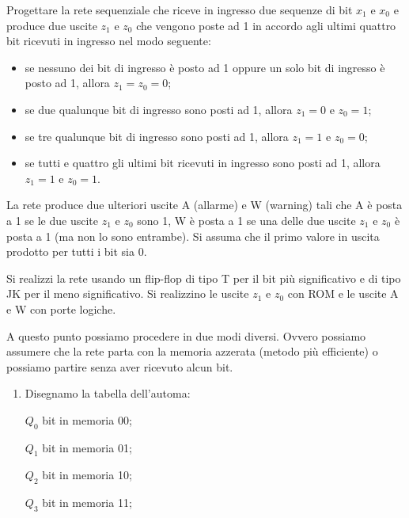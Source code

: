 \begin{exercise}
    Progettare la rete sequenziale che riceve in ingresso due sequenze di bit $x_1$ e $x_0$ e produce due uscite $z_1$ e $z_0$ che vengono poste ad 1 in accordo agli ultimi quattro bit ricevuti in ingresso nel modo seguente:
    \begin{itemize}
        \item se nessuno dei bit di ingresso è posto ad 1 oppure un solo bit di ingresso è posto ad 1, allora $z_1=z_0=0$;
        \item se due qualunque bit di ingresso sono posti ad 1, allora $z_1=0$ e $z_0=1$;
        \item se tre qualunque bit di ingresso sono posti ad 1, allora $z_1=1$ e $z_0=0$;
        \item se tutti e quattro gli ultimi bit ricevuti in ingresso sono posti ad 1, allora $z_1=1$ e $z_0=1$.
    \end{itemize}

La rete produce due ulteriori uscite A (allarme) e W (warning) tali che A è posta a 1 se le due uscite $z_1$ e $z_0$ sono 1, W è posta a 1 se una delle due uscite $z_1$ e $z_0$ è posta a 1 (ma non lo sono entrambe).
Si assuma che il primo valore in uscita prodotto per tutti i bit sia 0.

Si realizzi la rete usando un flip-flop di tipo T per il bit più significativo e di tipo JK per il meno significativo. 
Si realizzino le uscite $z_1$ e $z_0$ con ROM e le uscite A e W con porte logiche.

A questo punto possiamo procedere in due modi diversi. Ovvero possiamo assumere che la rete parta con la memoria azzerata (metodo più efficiente) o possiamo partire senza aver ricevuto alcun bit.

\begin{enumerate}
    \item Disegnamo la tabella dell'automa:
    
    $Q_0$ bit in memoria 00;
    
    $Q_1$ bit in memoria 01;
    
    $Q_2$ bit in memoria 10;
    
    $Q_3$ bit in memoria 11;
    

\end{enumerate}
\end{exercise}

